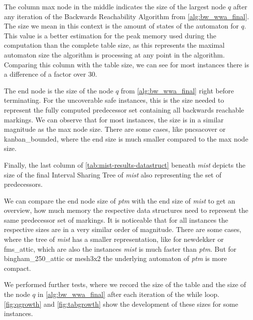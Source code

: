 The column max node in the middle indicates the size of the largest node $q$ after any iteration of the Backwards Reachability Algorithm from \autoref{alg:bw_wwa_final}. The size we mean in this context is the amount of states of the automaton for $q$. This value is a better estimation for the peak memory used during the computation than the complete table size, as this represents the maximal automaton size the algorithm is processing at any point in the algorithm. Comparing this column with the table size, we can see for most instances there is a difference of a factor over 30. 

The end node is the size of the node $q$ from \autoref{alg:bw_wwa_final} right before terminating. For the uncoverable safe instances, this is the size needed to represent the fully computed predecessor set containing all backwards reachable markings. We can observe that for most instances, the size is in a similar magnitude as the max node size. There are some cases, like pncsacover or kanban\_bounded, where the end size is much smaller compared to the max node size. 

Finally, the last column of \autoref{tab:mist-results-datastruct} beneath \textit{mist} depicts the size of the final Interval Sharing Tree of \textit{mist} also representing the set of predecessors.

We can compare the end node size of \textit{ptm} with the end size of  \textit{mist} to get an overview, how much memory the respective data structures need to represent the same predecessor set of markings. It is noticeable that for all instances the respective sizes are in a very similar order of magnitude. There are some cases, where the tree of \textit{mist} has a smaller representation, like for newdekker or fms\_attic, which are also the instances \textit{mist} is much faster than \textit{ptm}. But for bingham\_250\_attic or mesh3x2 the underlying automaton of \textit{ptm} is more compact. 

\bigbreak 

We performed further tests, where we record the size of the table and the size of the node $q$ in \autoref{alg:bw_wwa_final} after each iteration of the while loop. 
\autoref{fig:qgrowth} and \autoref{fig:tabgrowth} show the development of these sizes for some instances.


